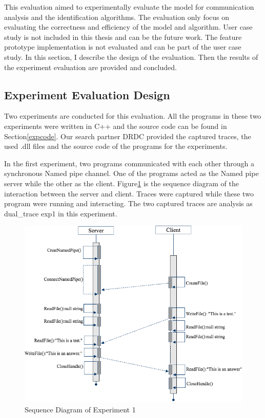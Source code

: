 

\label{chapter:Exp}
This evaluation aimed to experimentally evaluate the model for communication analysis and the identification algorithms. The evaluation only focus on evaluating the correctness and efficiency of the model and algorithm. User case study is not included in this thesis and can be the future work. The feature prototype implementation is not evaluated and can be part of the user case study. In this section, I describe the design of the evaluation.  Then the results of the experiment evaluation are provided and concluded.

\subsection{Experiment Evaluation Design}
Two experiments are conducted for this evaluation.  All the programs in these two experiments were written in C++ and the source code can be found in Section\ref{expcode}. Our search partner DRDC provided the captured traces, the used .dll files and  the source code of the programs for the experiments.

In the first experiment, two programs communicated with each other through a synchronous Named pipe channel. One of the programs acted as the Named pipe server while the other as the client. Figure\ref{exp1} is the sequence diagram of the interaction between the server and client. Traces were captured while these two program were running and interacting. The two captured traces are analysis as dual\_trace exp1 in this experiment. 

\begin{figure}[H]
\centerline{\includegraphics[scale=0.7]{Figures/exp1}}
 \caption{Sequence Diagram of Experiment 1}
\label{exp1}
\end{figure}

